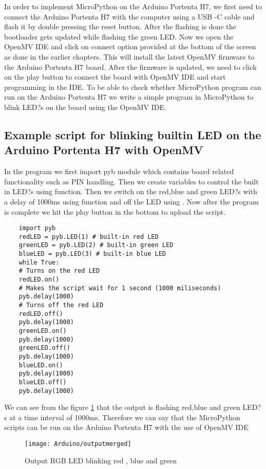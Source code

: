 In order to implement MicroPython on the Arduino Portenta H7, we first need to connect the Arduino Portenta H7 with the computer using a USB -C cable and flash it by double pressing the reset button. After the flashing is done the bootloader gets updated while flashing the green LED. Now we open the OpenMV IDE and click on connect option provided at the bottom of the screen as done in the earlier chapters. This will install the latest OpenMV firmware to the Arduino Portenta H7 board. After the firmware is updated, we need to click on the play button to connect the board with OpenMV IDE and start programming in the IDE.
To be able to check whether MicroPython program can run on the Arduino Portenta H7 we write a simple program in MicroPython to blink LED?s on the board using the OpenMV IDE.
\subsection{Example script for blinking builtin LED on the Arduino Portenta H7 with OpenMV}
In the program we first import pyb module which contains board related functionality such as PIN handling. Then we create variables to control the built in LED?s using  function. Then we switch on the red,blue and green LED?s with a delay of 1000ms  using  function and off the LED using  . Now after the program is complete we hit the play button in the bottom to upload the script.

\begin{lstlisting}
	import pyb
	redLED = pyb.LED(1) # built-in red LED
	greenLED = pyb.LED(2) # built-in green LED
	blueLED = pyb.LED(3) # built-in blue LED
	while True:
	# Turns on the red LED
	redLED.on()
	# Makes the script wait for 1 second (1000 miliseconds)
	pyb.delay(1000)
	# Turns off the red LED
	redLED.off()
	pyb.delay(1000)
	greenLED.on()
	pyb.delay(1000)
	greenLED.off()
	pyb.delay(1000)
	blueLED.on()
	pyb.delay(1000)
	blueLED.off()
	pyb.delay(1000)
\end{lstlisting}



We can see from the figure \ref{figure 7.2} that the output is flashing red,blue and green LED?s at a time interval of 1000ms. Therefore we can say that the MicroPython scripts can be run on the Arduino Portenta H7 with the use of OpenMV IDE
\begin{figure}[H]
	\centering
	\texttt{[image: Arduino/outputmerged]}
	\caption{Output RGB LED blinking red , blue and green}
	\label{figure 7.2}
\end{figure}



